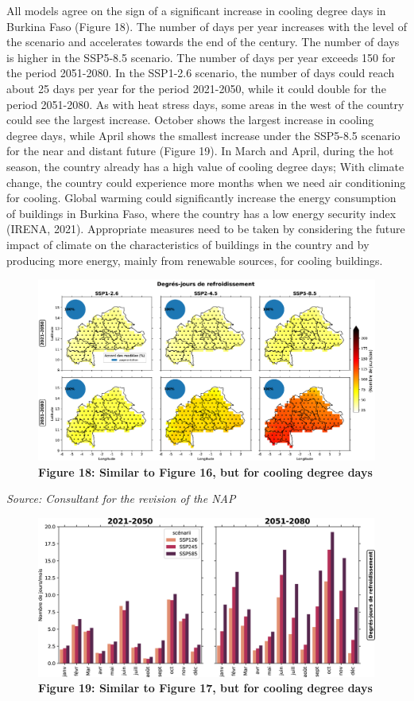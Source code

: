 \documentclass[
]{book}
\begin{document}
All models agree on the sign of a significant increase in cooling degree days in Burkina Faso (Figure 18). The number of days per year increases with the level of the scenario and accelerates towards the end of the century. The number of days is higher in the SSP5-8.5 scenario. The number of days per year exceeds 150 for the period 2051-2080. In the SSP1-2.6 scenario, the number of days could reach about 25 days per year for the period 2021-2050, while it could double for the period 2051-2080. As with heat stress days, some areas in the west of the country could see the largest increase. October shows the largest increase in cooling degree days, while April shows the smallest increase under the SSP5-8.5 scenario for the near and distant future (Figure 19). In March and April, during the hot season, the country already has a high value of cooling degree days; With climate change, the country could experience more months when we need air conditioning for cooling. Global warming could significantly increase the energy consumption of buildings in Burkina Faso, where the country has a low energy security index (IRENA, 2021). Appropriate measures need to be taken by considering the future impact of climate on the characteristics of buildings in the country and by producing more energy, mainly from renewable sources, for cooling buildings.

\begin{figure}
\centering
\includegraphics{Figures and Photos/Figure 18.png}
\caption{\textbf{Figure 18: Similar to Figure 16, but for cooling degree days}}
\end{figure}

\emph{Source: Consultant for the revision of the NAP}

\begin{figure}
\centering
\includegraphics{Figures and Photos/Figure 19.png}
\caption{\textbf{Figure 19: Similar to Figure 17, but for cooling degree days}}
\end{figure}
\end{document}
